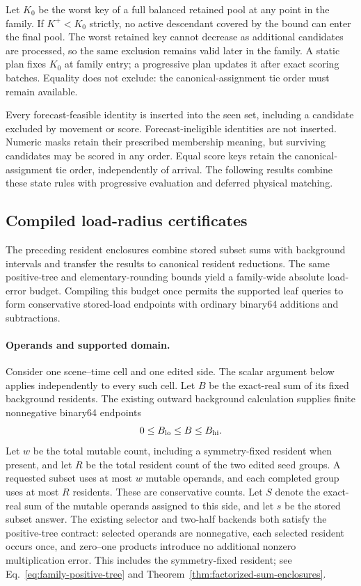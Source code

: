 \documentclass[11pt]{article}
\begin{document}
Let $K_0$ be the worst key of a full balanced retained pool at any point in the family. If $K^+<K_0$ strictly, no active descendant covered by the bound can enter the final pool. The worst retained key cannot decrease as additional candidates are processed, so the same exclusion remains valid later in the family. A static plan fixes $K_0$ at family entry; a progressive plan updates it after exact scoring batches. Equality does not exclude: the canonical-assignment tie order must remain available.

Every forecast-feasible identity is inserted into the seen set, including a candidate excluded by movement or score. Forecast-ineligible identities are not inserted. Numeric masks retain their prescribed membership meaning, but surviving candidates may be scored in any order. Equal score keys retain the canonical-assignment tie order, independently of arrival. The following results combine these state rules with progressive evaluation and deferred physical matching.


\subsection{Compiled load-radius certificates}
\label{sec:uniform-load-radii}

The preceding resident enclosures combine stored subset sums with background intervals and transfer the results to canonical resident reductions. The same positive-tree and elementary-rounding bounds yield a family-wide absolute load-error budget. Compiling this budget once permits the supported leaf queries to form conservative stored-load endpoints with ordinary binary64 additions and subtractions.

\paragraph{Operands and supported domain.}
Consider one scene--time cell and one edited side. The scalar argument below applies independently to every such cell. Let $B$ be the exact-real sum of its fixed background residents. The existing outward background calculation supplies finite nonnegative binary64 endpoints
\begin{equation}
0\le B_{\rm lo}\le B\le B_{\rm hi}.
\label{eq:uniform-background}
\end{equation}
Let $w$ be the total mutable count, including a symmetry-fixed resident when present, and let $R$ be the total resident count of the two edited seed groups. A requested subset uses at most $w$ mutable operands, and each completed group uses at most $R$ residents. These are conservative counts. Let $S$ denote the exact-real sum of the mutable operands assigned to this side, and let $s$ be the stored subset answer. The existing selector and two-half backends both satisfy the positive-tree contract: selected operands are nonnegative, each selected resident occurs once, and zero--one products introduce no additional nonzero multiplication error. This includes the symmetry-fixed resident; see Eq.~\eqref{eq:family-positive-tree} and Theorem~\ref{thm:factorized-sum-enclosures}.
\end{document}
